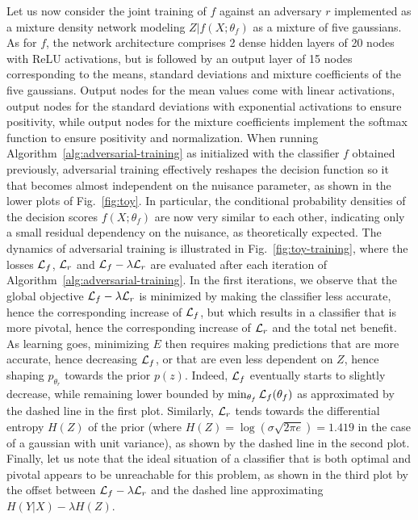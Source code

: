 \documentclass[twocolumn,superscriptaddress,aps]{revtex4-1}
\theoremstyle{plain}
\begin{document}
Let us now consider the joint training of $f$ against an adversary $r$
implemented as a mixture density network modeling $Z|f(X;\theta_f)$ as a mixture
of five gaussians. As for $f$, the network architecture comprises 2 dense hidden
layers of 20 nodes with ReLU activations, but is followed by an output layer of
15 nodes corresponding to the means, standard deviations and mixture
coefficients of the five gaussians. Output nodes for the mean values come with
linear activations, output nodes for the standard deviations with exponential
activations to ensure positivity, while output nodes for the mixture coefficients
implement the softmax function to ensure positivity and normalization. When
running Algorithm~\ref{alg:adversarial-training} as initialized with the
classifier $f$ obtained previously, adversarial training effectively reshapes
the decision function so it that becomes almost independent on the nuisance
parameter, as shown in the lower plots of Fig.~\ref{fig:toy}. In particular,
the conditional probability densities of the decision scores $f(X;\theta_f)$ are
now very similar to each other, indicating only a small residual  dependency on the
nuisance, as theoretically expected. The dynamics of adversarial training is
illustrated in Fig.~\ref{fig:toy-training}, where the losses ${\cal L}_f$,
${\cal L}_r$ and ${\cal L}_f - \lambda {\cal L}_r$ are evaluated after each
iteration of Algorithm~\ref{alg:adversarial-training}. In the first iterations,
we observe that the global objective ${\cal L}_f - \lambda {\cal L}_r$ is
minimized by making the classifier less accurate, hence the corresponding
increase of ${\cal L}_f$, but which results in a classifier that is more
pivotal, hence the corresponding increase of ${\cal L}_r$ and the total net
benefit. As learning goes, minimizing $E$ then requires making predictions that
are more accurate, hence decreasing ${\cal L}_f$, or that are even less dependent on
$Z$, hence shaping $p_{\theta_r}$ towards the prior $p(z)$. Indeed, ${\cal L}_f$
eventually starts to slightly decrease, while remaining lower bounded by
$\min_{\theta_f} {\cal L}_f(\theta_f)$ as approximated by the dashed line in the
first plot. Similarly,  ${\cal L}_r$ tends towards the differential entropy
$H(Z)$ of the prior (where $H(Z) = \log(\sigma \sqrt{2 \pi e}) = 1.419$ in the
case of a gaussian with unit variance), as shown by the dashed line in the
second plot.
Finally, let us note that the ideal situation of a
classifier that is both optimal and pivotal appears to be unreachable for this
problem, as shown in the third plot by the  offset between ${\cal L}_f - \lambda
{\cal L}_r$ and the dashed line approximating $H({Y|X}) -
\lambda H(Z)$.
\end{document}
